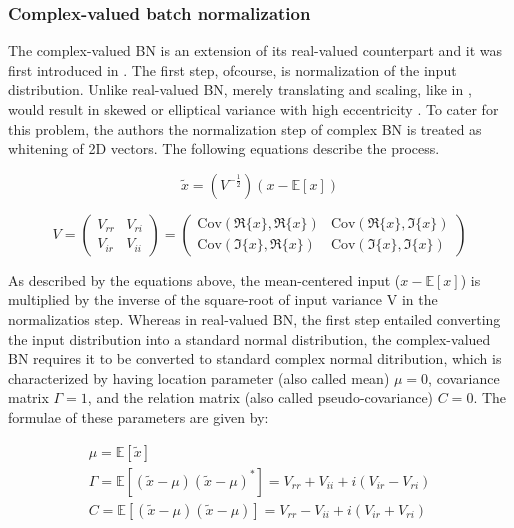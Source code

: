  \subsubsection{Complex-valued batch normalization}
The complex-valued BN is an extension of its real-valued counterpart and it was first introduced in \cite{trabelsi2018deep}. The first step, ofcourse, is normalization of the input distribution. Unlike real-valued BN, merely translating and scaling, like in \cite{bnIoffeS15}, would result in skewed or elliptical variance with high eccentricity \cite{trabelsi2018deep}. To cater for this problem, the authors the normalization step of complex BN is treated  as whitening of 2D vectors. The following equations describe the process.

 \begin{equation}
\tilde{x} = (V^{-\frac{1}{2}})(x - \mathbb{E}[x])
\label{eqcbn1}
\end{equation}

 \begin{equation}
V = \begin{pmatrix} V_{rr} & V_{ri}\\ V_{ir} & V_{ii} \end{pmatrix} = 
\begin{pmatrix} \mathrm{Cov}(\Re{\{x\}},\Re{\{x\}}) & \mathrm{Cov}(\Re{\{x\}},\Im{\{x\}})\\  \mathrm{Cov}(\Im{\{x\}},\Re{\{x\}}) & \mathrm{Cov}(\Im{\{x\}},\Im{\{x\}}) \end{pmatrix}
\label{eqcbn2}
\end{equation}

As described by the equations above, the mean-centered input ($x - \mathbb{E}[x]$) is multiplied by the inverse of the square-root of input variance $\mathrm{V}$ in the normalizatios step.%
Whereas in real-valued BN, the first step entailed converting the input distribution into a standard normal distribution, the complex-valued BN requires it to be converted to standard complex normal ditribution, which is characterized by having location parameter (also called mean) $\mu = 0$, covariance matrix $\Gamma = 1$, and the relation matrix (also called pseudo-covariance) $C = 0$. The formulae of these parameters are given by:

\begin{equation}
\label{eqcbn3}
\begin{aligned}
&\mu = \mathbb{E}[\tilde{x}]&\\
&\Gamma = \mathbb{E}[(\tilde{x}-\mu)(\tilde{x}-\mu)^{*}] = V_{rr} + V_{ii} + i (V_{ir} - V_{ri} )&\\
&C = \mathbb{E}[(\tilde{x}-\mu)(\tilde{x}-\mu)] = V_{rr} - V_{ii} + i (V_{ir} + V_{ri} )&
\end{aligned}
\end{equation}

